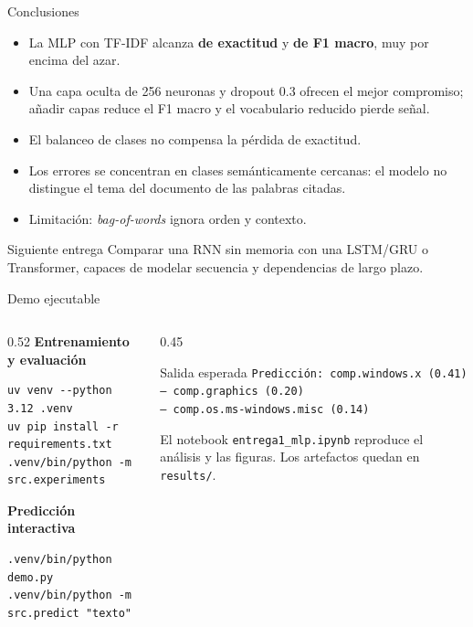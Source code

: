 \documentclass[10pt,aspectratio=169]{beamer}
\begin{document}
\begin{frame}{Conclusiones}
  \begin{itemize}
    \item La MLP con TF-IDF alcanza \textbf{\Accuracy{} de exactitud} y
          \textbf{\MacroF{} de F1 macro}, muy por encima del azar.
    \item Una capa oculta de 256 neuronas y dropout 0.3 ofrecen el mejor
          compromiso; añadir capas reduce el F1 macro y el vocabulario
          reducido pierde señal.
    \item El balanceo de clases no compensa la pérdida de exactitud.
    \item Los errores se concentran en clases semánticamente cercanas:
          el modelo no distingue el tema del documento de las palabras citadas.
    \item Limitación: \textit{bag-of-words} ignora orden y contexto.
  \end{itemize}
  \vspace{0.3cm}
  \begin{block}{Siguiente entrega}
    Comparar una RNN sin memoria con una LSTM/GRU o Transformer, capaces de
    modelar secuencia y dependencias de largo plazo.
  \end{block}
\end{frame}

\begin{frame}[fragile]{Demo ejecutable}
  \begin{columns}[T]
    \begin{column}{0.52\textwidth}
      \textbf{Entrenamiento y evaluación}
      \begin{verbatim}
uv venv --python 3.12 .venv
uv pip install -r requirements.txt
.venv/bin/python -m src.experiments
      \end{verbatim}
      \textbf{Predicción interactiva}
      \begin{verbatim}
.venv/bin/python demo.py
.venv/bin/python -m src.predict "texto"
      \end{verbatim}
    \end{column}
    \begin{column}{0.45\textwidth}
      \begin{block}{Salida esperada}
        \small
        \texttt{Predicción: comp.windows.x (0.41)}\\
        \texttt{--- comp.graphics (0.20)}\\
        \texttt{--- comp.os.ms-windows.misc (0.14)}
      \end{block}
      \small
      El notebook \texttt{entrega1\_mlp.ipynb} reproduce el análisis y las
      figuras. Los artefactos quedan en \texttt{results/}.
    \end{column}
  \end{columns}
\end{frame}
\end{document}
